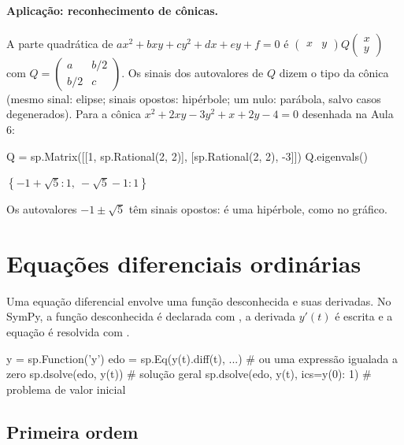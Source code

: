 \paragraph{Aplicação: reconhecimento de cônicas.} A parte quadrática de $ax^2+bxy+cy^2+dx+ey+f=0$ é
$\begin{pmatrix}x&y\end{pmatrix}Q\begin{pmatrix}x\\y\end{pmatrix}$ com $Q=\begin{pmatrix}a&b/2\\b/2&c\end{pmatrix}$. Os
sinais dos autovalores de $Q$ dizem o tipo da cônica (mesmo sinal: elipse; sinais opostos: hipérbole; um nulo:
parábola, salvo casos degenerados). Para a cônica $x^2+2xy-3y^2+x+2y-4=0$ desenhada na Aula 6:

\begin{entrada}
Q = sp.Matrix([[1, sp.Rational(2, 2)], [sp.Rational(2, 2), -3]])
Q.eigenvals()
\end{entrada}
\begin{saidamat}
$\displaystyle \left\{ -1 + \sqrt{5} : 1, \  - \sqrt{5} - 1 : 1\right\}$
\end{saidamat}

Os autovalores $-1\pm\sqrt5$ têm sinais opostos: é uma hipérbole, como no gráfico.

\section{Equações diferenciais ordinárias}

Uma equação diferencial envolve uma função desconhecida e suas derivadas. No SymPy, a função desconhecida é
declarada com , a derivada $y'(t)$ é escrita  e a equação é resolvida com
.

\begin{sintaxe}
y = sp.Function('y')
edo = sp.Eq(y(t).diff(t), ...)              # ou uma expressão igualada a zero
sp.dsolve(edo, y(t))                        # solução geral
sp.dsolve(edo, y(t), ics={y(0): 1})         # problema de valor inicial
\end{sintaxe}

\subsection{Primeira ordem}

